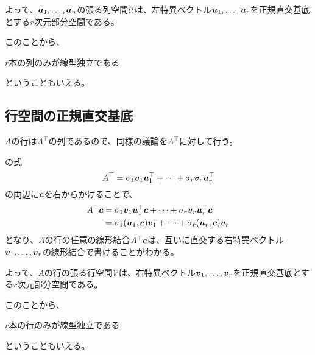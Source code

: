 \documentclass[../../../topic_linear-algebra]{subfiles}
\begin{document}
\br

よって、$\vb*{a}_1,\ldots,\vb*{a}_n$の張る列空間$\mathcal{U}$は、左特異ベクトル$\vb*{u}_1,\ldots,\vb*{u}_r$を正規直交基底とする$r$次元部分空間である。

\br

このことから、
\begin{emphabox}
  \begin{spacebox}
    \begin{center}
      $r$本の列のみが線型独立である
    \end{center}
  \end{spacebox}
\end{emphabox}
ということもいえる。

\subsection{行空間の正規直交基底}

$A$の行は$A^\top$の列であるので、同様の議論を$A^\top$に対して行う。

\br

の式
\begin{equation*}
  A^\top = \sigma_1\vb*{v}_1\vb*{u}_1^\top + \cdots + \sigma_r \vb*{v}_r \vb*{u}_r^\top
\end{equation*}
の両辺に$\vb*{c}$を右からかけることで、
\begin{align*}
  A^\top \vb*{c} & = \sigma_1\vb*{v}_1\vb*{u}_1^\top \vb*{c} + \cdots + \sigma_r \vb*{v}_r \vb*{u}_r^\top \vb*{c} \\
                 & = \sigma_1 (\vb*{u}_1, \vb*{c}) \vb*{v}_1 + \cdots + \sigma_r (\vb*{u}_r, \vb*{c}) \vb*{v}_r
\end{align*}
となり、$A$の行の任意の線形結合$A^\top \vb*{c}$は、互いに直交する右特異ベクトル$\vb*{v}_1,\ldots,\vb*{v}_r$の線形結合で書けることがわかる。

\br

よって、$A$の行の張る行空間$\mathcal{V}$は、右特異ベクトル$\vb*{v}_1,\ldots,\vb*{v}_r$を正規直交基底とする$r$次元部分空間である。

\br

このことから、
\begin{emphabox}
  \begin{spacebox}
    \begin{center}
      $r$本の行のみが線型独立である
    \end{center}
  \end{spacebox}
\end{emphabox}
ということもいえる。
\end{document}
